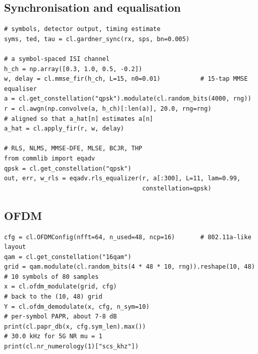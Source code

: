\subsection{Synchronisation and equalisation}

\begin{lstlisting}
# symbols, detector output, timing estimate
syms, ted, tau = cl.gardner_sync(rx, sps, bn=0.005)

# a symbol-spaced ISI channel
h_ch = np.array([0.3, 1.0, 0.5, -0.2])
w, delay = cl.mmse_fir(h_ch, L=15, n0=0.01)           # 15-tap MMSE equaliser
a = cl.get_constellation("qpsk").modulate(cl.random_bits(4000, rng))
r = cl.awgn(np.convolve(a, h_ch)[:len(a)], 20.0, rng=rng)
# aligned so that a_hat[n] estimates a[n]
a_hat = cl.apply_fir(r, w, delay)

# RLS, NLMS, MMSE-DFE, MLSE, BCJR, THP
from commlib import eqadv
qpsk = cl.get_constellation("qpsk")
out, err, w_rls = eqadv.rls_equalizer(r, a[:300], L=11, lam=0.99,
                                      constellation=qpsk)
\end{lstlisting}


\subsection{OFDM}

\begin{lstlisting}
cfg = cl.OFDMConfig(nfft=64, n_used=48, ncp=16)       # 802.11a-like layout
qam = cl.get_constellation("16qam")
grid = qam.modulate(cl.random_bits(4 * 48 * 10, rng)).reshape(10, 48)
# 10 symbols of 80 samples
x = cl.ofdm_modulate(grid, cfg)
# back to the (10, 48) grid
Y = cl.ofdm_demodulate(x, cfg, n_sym=10)
# per-symbol PAPR, about 7-8 dB
print(cl.papr_db(x, cfg.sym_len).max())
# 30.0 kHz for 5G NR mu = 1
print(cl.nr_numerology(1)["scs_khz"])
\end{lstlisting}


